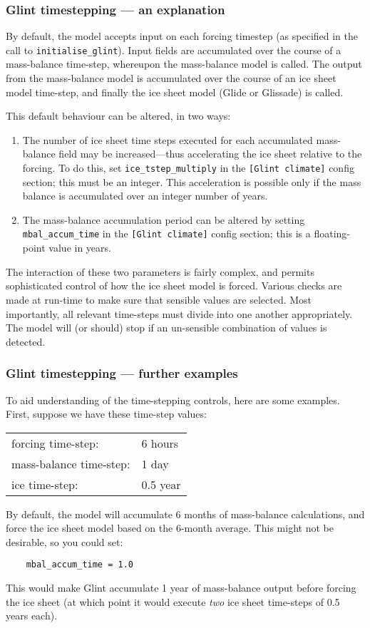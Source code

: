 \subsubsection{Glint timestepping --- an explanation}

By default, the model accepts input on each forcing timestep (as specified in 
the call to \texttt{initialise\_glint}). Input fields are accumulated over the course 
of a mass-balance time-step, whereupon the mass-balance model is called. The 
output from the mass-balance model is accumulated over the course of an ice sheet
model time-step, and finally the ice sheet model (Glide or Glissade) is called.

This default behaviour can be altered, in two ways:
\begin{enumerate}
\item The number of ice sheet time steps executed for each accumulated 
mass-balance field may be increased---thus accelerating the ice sheet relative 
to the forcing. To do this, set \texttt{ice\_tstep\_multiply} in the \texttt{[Glint climate]} 
config section; this must be an integer. This acceleration is possible only if the 
mass balance is accumulated over an integer number of years.
\item The mass-balance accumulation period can be altered by setting  
\texttt{mbal\_accum\_time} in the \texttt{[Glint climate]} config section; this is a 
floating-point value in years.
\end{enumerate}
%
The interaction of these two parameters is fairly complex, and permits
sophisticated control of how the ice sheet model is forced. 
Various checks are made at run-time to make sure that sensible values are selected. Most 
importantly, all relevant time-steps must divide into one another 
appropriately. The model will (or should) stop if an un-sensible combination 
of values is detected.

\subsubsection{Glint timestepping --- further examples}

To aid understanding of the time-stepping controls, here are some examples. First, suppose we have these time-step values:

\vspace{0.5cm}
\begin{tabular}{ll}
forcing time-step: & 6 hours \\
mass-balance time-step: & 1 day \\
ice time-step: & 0.5 year
\end{tabular}
\vspace{0.5cm}
%
By default, the model will accumulate 6 months of mass-balance 
calculations, and force the ice sheet model based on the 6-month average. This might not be 
desirable, so you could set:
%
\begin{verbatim}
    mbal_accum_time = 1.0
\end{verbatim}
%
This would make Glint accumulate 1 year of mass-balance output before 
forcing the ice sheet (at which point it would execute \emph{two} ice sheet 
time-steps of 0.5 years each).

